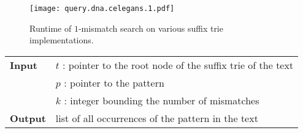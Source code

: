 \begin{figure}[b]
\begin{center}
\caption[$k$-mismatches runtime]{Runtime of $1$-mismatch search on various suffix trie implementations.}
\label{fig:query-dna-apx}
\texttt{[image: query.dna.celegans.1.pdf]}
\end{center}
\end{figure}

\begin{figure*}[t]
\begin{center}
\begin{minipage}[t]{.8\textwidth}
\begin{algorithm}[H]
\begin{tabular}{ll}
\textbf{Input}  & $t$ : pointer to the root node of the suffix trie of the text\\
 			    & $p$ : pointer to the pattern\\
 			    & $k$ : integer bounding the number of mismatches\\
\textbf{Output} & list of all occurrences of the pattern in the text\\
\end{tabular}
\begin{algorithmic}[1]
\Else
		\State \Report {}
		\Repeat
			\State {}
			\State {}
			\State {}
		\Until {}
	\EndIf
\EndIf
\end{algorithmic}
\label{alg:st-hamming}
\end{algorithm}
\end{minipage}
\end{center}
\end{figure*}


%


